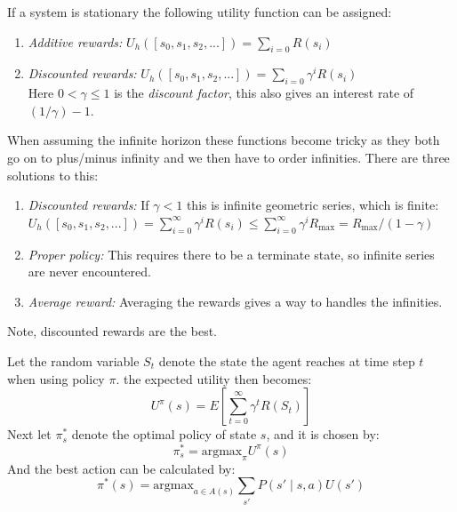 \documentclass[11pt, letterpaper]{report}
\numberwithin{equation}{section}
\begin{document}
If a system is stationary the following utility function can be assigned:
\begin{enumerate}
\item \emph{Additive rewards:} $U_h([s_0,s_1,s_2,...]) = \sum_{i=0} R(s_i)$
\item \emph{Discounted rewards:} $U_h([s_0,s_1,s_2,...]) = \sum_{i=0}
  \gamma^i R(s_i)$ \\ Here $0 < \gamma \leq 1$ is the \emph{discount factor},
  this also gives an interest rate of $(1/\gamma)-1$.
\end{enumerate}
When assuming the infinite horizon these functions become tricky as they both go
on to plus/minus infinity and we then have to order infinities. There are three
solutions to this:
\begin{enumerate}
\item \emph{Discounted rewards:} If $\gamma < 1$ this is infinite geometric
  series, which is finite: \\
  $U_h([s_0,s_1,s_2,...]) = \sum_{i=0}^\infty \gamma^i R(s_i) \leq
  \sum_{i=0}^\infty \gamma^i R_{\max} = R_{ \max } /(1-\gamma)$
\item \emph{Proper policy:} This requires there to be a terminate state, so
  infinite series are never encountered.
\item \emph{Average reward:} Averaging the rewards gives a way to handles the
  infinities.
\end{enumerate}
Note, discounted rewards are the best.

Let the random variable $S_t$ denote the state the agent reaches at time step
$t$ when using policy $\pi$. the expected utility then becomes:
\setcounter{equation}{1}
\begin{equation}
  \label{eq:expectedpolicyutil}
  U^\pi(s) = E[\sum_{t=0}^\infty \gamma^tR(S_t)]
\end{equation}
Next let $\pi^\ast_s$ denote the optimal policy of state $s$, and it is chosen
by:
\begin{equation}
  \label{eq:optimalpolicy}
  \pi^\ast_s = \text{argmax}_\pi U^\pi(s)
\end{equation}
And the best action can be calculated by:
\begin{equation}
  \label{eq:bestaction}
  \pi^\ast(s) = \text{argmax}_{a \in A(s)} \sum_{ s' } P(s' \mid s,a)U(s')
\end{equation}
\end{document}

